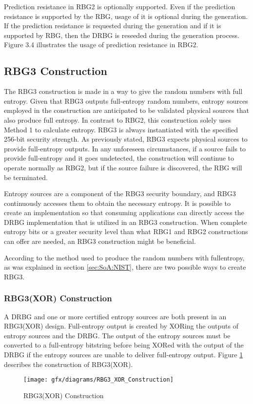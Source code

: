 Prediction resistance in RBG2 is optionally supported. Even if the prediction resistance is supported by the RBG, usage of it is optional during the generation.  If the prediction resistance is requested during the generation and if it is supported by RBG, then the DRBG is reseeded during the generation process. Figure 3.4 illustrates the usage of prediction resistance in RBG2.

%
%
\subsection{RBG3 Construction}
\label{subsec:SoA:RBG3}
The RBG3 construction is made in a way to give the random numbers with full entropy. Given that RBG3 outputs full-entropy random numbers, entropy sources employed in the construction are anticipated to be validated physical sources that also produce full entropy. In contrast to RBG2, this construction solely uses Method 1 to calculate entropy.  RBG3 is always instantiated with the specified 256-bit security strength. As previously stated, RBG3 expects physical sources to provide full-entropy outputs. In any unforeseen circumstances, if a source fails to provide full-entropy and it goes undetected, the construction will continue to operate normally as RBG2, but if the source failure is discovered, the RBG will be terminated.

Entropy sources are a component of the RBG3 security boundary, and RBG3 continuously accesses them to obtain the necessary entropy. It is possible to create an implementation so that consuming applications can directly access the DRBG implementation that is utilized in an RBG3 construction. When complete entropy bits or a greater security level than what RBG1 and RBG2 constructions can offer are needed, an RBG3 construction might be beneficial.

According to the method used to produce the random numbers with full\-entropy, as was explained in section \ref{sec:SoA:NIST}, there are two possible ways to create RBG3.

%
%
\subsubsection{RBG3(XOR) Construction}
\label{subsubsec:SoA:RBG3:XOR}
A DRBG and one or more certified entropy sources are both present in an RBG3(XOR) design. Full-entropy output is created by XORing the outputs of entropy sources and the DRBG. The output of the entropy sources must be converted to a full-entropy bitstring before being XORed with the output of the DRBG if the entropy sources are unable to deliver full-entropy output. Figure \ref{fig:3:5} describes the construction of RBG3(XOR).
\begin{figure}[htbp]
	\centering
	\texttt{[image: gfx/diagrams/RBG3\_XOR\_Construction]}
	\caption{RBG3(XOR) Construction}
	\label{fig:3:5}
\end{figure}

